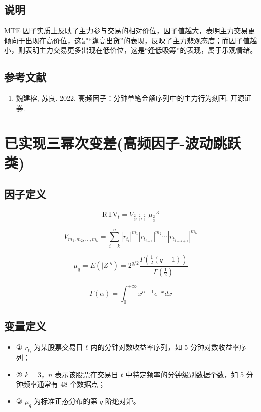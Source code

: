 \documentclass{article}
\begin{document}
\subsection{说明}
MTE 因子实质上反映了主力参与交易的相对价位，因子值越大，表明主力交易更倾向于出现在高价位，这是“逢高出货”的表现，反映了主力悲观态度；而因子值越小，则表明主力交易更多出现在低价位，这是“逢低吸筹”的表现，属于乐观情绪。

\subsection{参考文献}
\begin{enumerate}
    \item 魏建榕, 苏良. 2022. 高频因子：分钟单笔金额序列中的主力行为刻画. 开源证券.
\end{enumerate}

\section{已实现三幂次变差(高频因子-波动跳跃类)}

\subsection{因子定义}

\begin{equation}
    \mathrm{RTV}_t = V_{\frac{2}{3}, \frac{2}{3}, \frac{2}{3}} \; \mu_{\frac{2}{3}}^{-3}
\end{equation}

\begin{equation}
    V_{m_1, m_2, \dots, m_k} = \sum_{i=k}^{n} |r_{t_i}|^{m_1} |r_{t_{i-1}}|^{m_2} \cdots |r_{t_{i-k+1}}|^{m_k}
\end{equation}

\begin{equation}
    \mu_q = E(|Z|^q) = 2^{q/2} \frac{\Gamma\left(\frac{1}{2}(q+1)\right)}{\Gamma\left(\frac{1}{2}\right)}
\end{equation}

\begin{equation}
    \Gamma(\alpha) = \int_0^{+\infty} x^{\alpha-1} e^{-x} dx
\end{equation}

\subsection{变量定义}
\begin{itemize}
    \item ① \( r_{t_i} \) 为某股票交易日 \( t \) 内的分钟对数收益率序列，如 5 分钟对数收益率序列；
    \item ② \( k=3 \)，\( n \) 表示该股票在交易日 \( t \) 中特定频率的分钟级别数据个数，如 5 分钟频率通常有 48 个数据点；
    \item ③ \( \mu_q \) 为标准正态分布的第 \( q \) 阶绝对矩。
\end{itemize}
\end{document}
